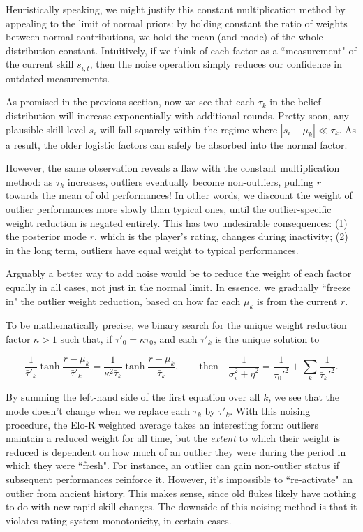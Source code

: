 \documentclass{article}
\begin{document}
Heuristically speaking, we might justify this constant multiplication method by appealing to the limit of normal priors: by holding constant the ratio of weights between normal contributions, we hold the mean (and mode) of the whole distribution constant. Intuitively, if we think of each factor as a ``measurement" of the current skill $s_{i,t}$, then the noise operation simply reduces our confidence in outdated measurements.

As promised in the previous section, now we see that each $\tau_k$ in the belief distribution will increase exponentially with additional rounds. Pretty soon, any plausible skill level $s_i$ will fall squarely within the regime where $|s_i-\mu_k| \ll \tau_k$. As a result, the older logistic factors can safely be absorbed into the normal factor.

However, the same observation reveals a flaw with the constant multiplication method: as $\tau_k$ increases, outliers eventually become non-outliers, pulling $r$ towards the mean of old performances! In other words, we discount the weight of outlier performances more slowly than typical ones, until the outlier-specific weight reduction is negated entirely. This has two undesirable consequences: (1) the posterior mode $r$, which is the player's rating, changes during inactivity; (2) in the long term, outliers have equal weight to typical performances.

Arguably a better way to add noise would be to reduce the weight of each factor equally in all cases, not just in the normal limit. In essence, we gradually ``freeze in" the outlier weight reduction, based on how far each $\mu_k$ is from the current $r$.

To be mathematically precise, we binary search for the unique weight reduction factor $\kappa>1$ such that, if $\tau'_0=\kappa\tau_0$, and each $\tau'_k$ is the unique solution to

\[
\frac{1}{\bar\tau'_k} \tanh \frac {r-\mu_k} {\bar\tau'_k}
= \frac{1}{\kappa^2\bar\tau_k} \tanh \frac {r-\mu_k} {\bar\tau_k},\qquad
\text{then} \quad \frac{1}{\bar\sigma_i^2 + \bar\eta^2}
= \frac{1}{\tau_0'^2} + \sum_k \frac{1}{\bar\tau_k'^2}.
\]

By summing the left-hand side of the first equation over all $k$, we see that the mode doesn't change when we replace each $\tau_k$ by $\tau'_k$. With this noising procedure, the Elo-R weighted average takes an interesting form: outliers maintain a reduced weight for all time, but the \textit{extent} to which their weight is reduced is dependent on how much of an outlier they were during the period in which they were ``fresh". For instance, an outlier can gain non-outlier status if subsequent performances reinforce it. However, it's impossible to ``re-activate" an outlier from ancient history. This makes sense, since old flukes likely have nothing to do with new rapid skill changes. The downside of this noising method is that it violates rating system monotonicity, in certain cases.
\end{document}
